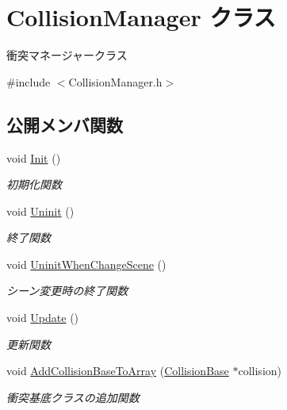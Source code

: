 \hypertarget{class_collision_manager}{}\section{Collision\+Manager クラス}
\label{class_collision_manager}


衝突マネージャークラス  




{\ttfamily \#include $<$Collision\+Manager.\+h$>$}

\subsection*{公開メンバ関数}
\begin{DoxyCompactItemize}
\item 
void \mbox{\hyperlink{class_collision_manager_a2c5770b90b7a46a5674df008a7a57145}{Init}} ()
\begin{DoxyCompactList}\small\item\em 初期化関数 \end{DoxyCompactList}\item 
void \mbox{\hyperlink{class_collision_manager_abfa4b87f3ce102f0d173e112e7963f09}{Uninit}} ()
\begin{DoxyCompactList}\small\item\em 終了関数 \end{DoxyCompactList}\item 
void \mbox{\hyperlink{class_collision_manager_a33ce56b5a6f68d71b0f2bf733413dddb}{Uninit\+When\+Change\+Scene}} ()
\begin{DoxyCompactList}\small\item\em シーン変更時の終了関数 \end{DoxyCompactList}\item 
void \mbox{\hyperlink{class_collision_manager_a23c21d077dbfd7ca86e7c0649d775dfc}{Update}} ()
\begin{DoxyCompactList}\small\item\em 更新関数 \end{DoxyCompactList}\item 
void \mbox{\hyperlink{class_collision_manager_a42be7a26321110f5daaf1828da32f667}{Add\+Collision\+Base\+To\+Array}} (\mbox{\hyperlink{class_collision_base}{Collision\+Base}} $\ast$collision)
\begin{DoxyCompactList}\small\item\em 衝突基底クラスの追加関数 \end{DoxyCompactList}\item 

\end{DoxyCompactItemize}
